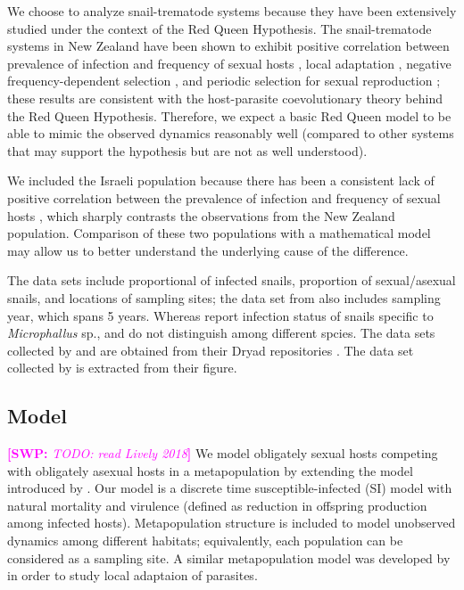 \documentclass{article}\usepackage[]{graphicx}\usepackage[]{color}
\newcommand{\comment}[3]{\textcolor{#1}{\textbf{[#2: }\textit{#3}\textbf{]}}}
\newcommand{\swp}[1]{\comment{magenta}{SWP}{#1}}
\begin{document}
We choose to analyze snail-trematode systems because they have been extensively studied under the context of the Red Queen Hypothesis.
The snail-trematode systems in New Zealand have been shown to exhibit positive correlation between prevalence of infection and frequency of sexual hosts \citep{lively2002temporal, king2011parasites, vergara2013geographic, mckone2016fine, gibson2016within}, local adaptation \citep{lively1989adaptation, lively2004host, king2011coevolutionary}, negative frequency-dependent selection \citep{dybdahl1995host, dybdahl1998host,jokela2009maintenance, koskella2009evidence}, and periodic selection for sexual reproduction \citep{vergara2014infection, gibson2018periodic}; these results are consistent with the host-parasite coevolutionary theory behind the Red Queen Hypothesis.
Therefore, we expect a basic Red Queen model to be able to mimic the observed dynamics reasonably well (compared to other systems that may support the hypothesis but are not as well understood).

We included the Israeli population because there has been a consistent lack of positive correlation between the prevalence of infection and frequency of sexual hosts \citep{heller1990sexual, ben2005spatial, ben2007temporal, ben2008sex, dagan2013clonal}, which sharply contrasts the observations from the New Zealand population.
Comparison of these two populations with a mathematical model may allow us to better understand the underlying cause of the difference.

The data sets include proportional of infected snails, proportion of sexual/asexual snails, and locations of sampling sites; the data set from \cite{vergara2014infection} also includes sampling year, which spans 5 years.
Whereas \cite{vergara2014infection} report infection status of snails specific to \textit{Microphallus} sp., \cite{mckone2016fine} and \cite{dagan2013clonal} do not distinguish among different spcies.
The data sets collected by \cite{dagan2013clonal} and \cite{vergara2014infection} are obtained from their Dryad repositories \citep{dryad_f5t56, dryad_29nk3_2}. 
The data set collected by \cite{mckone2016fine} is extracted from their figure.

\subsection{Model}

\swp{TODO: read Lively 2018}
We model obligately sexual hosts competing with obligately asexual hosts in a metapopulation by extending the model introduced by \cite{lively2010epidemiological}.
Our model is a discrete time susceptible-infected (SI) model with natural mortality and virulence (defined as reduction in offspring production among infected hosts).
Metapopulation structure is included to model unobserved dynamics among different habitats; equivalently, each population can be considered as a sampling site.
A similar metapopulation model was developed by \cite{lively2017habitat} in order to study local adaptaion of parasites.
\end{document}
